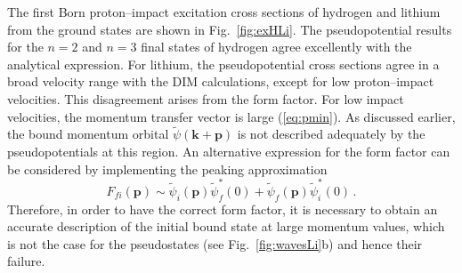 \documentclass[10pt]{article}
\begin{document}
The first Born proton--impact excitation cross sections of hydrogen 
and lithium from the ground states are shown in Fig.~\ref{fig:exHLi}.
The pseudopotential results for the $n=2$ and $n=3$ final states of
hydrogen agree excellently with the analytical expression. For 
lithium, the pseudopotential cross sections agree in a broad velocity 
range with the DIM calculations, except for low proton--impact velocities. 
This disagreement arises from the form 
factor. For low impact velocities, the momentum transfer vector is large 
(\ref{eq:pmin}). As discussed earlier, the bound momentum orbital
$\widetilde{\psi}(\mathbf{k}+\mathbf{p})$ is not described adequately 
by the pseudopotentials at this region. 
An alternative expression for the form factor can
be considered by implementing the peaking approximation
\begin{equation}
 F_{\!fi}(\mathbf{p}) \sim \widetilde{\psi}_i(\mathbf{p})\widetilde{\psi}_{\!f}^*(0)
 +\widetilde{\psi}_{\!f}(\mathbf{p})\widetilde{\psi}_i^*(0)\,.
\end{equation}
Therefore, in order to have the correct form factor, it is necessary to 
obtain an accurate description of the initial bound state at large
momentum values, which is not the case for the pseudostates (see 
Fig.~\ref{fig:wavesLi}b) and hence their failure.
\end{document}

